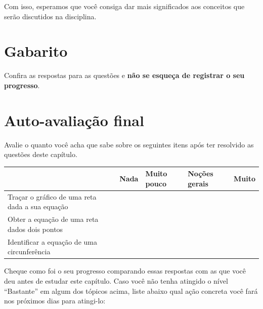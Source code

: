 \documentclass[main.tex]{subfiles}
\begin{document}
Com isso, esperamos que você consiga dar mais significados aos conceitos que serão discutidos na disciplina.

\section{Gabarito}

Confira as respostas para as questões e \textbf{não se esqueça de registrar o seu progresso}.

\imprimeGabarito

\paraAlunos

\section{Auto-avaliação final}
Avalie o quanto você acha que sabe sobre os seguintes itens após ter resolvido as questões deste capítulo.

\begin{center}
 \begin{tabular}{|p{25mm}||p{10mm}|p{10mm}|p{10mm}|p{10mm}|} 
 \hline
   & Nada & Muito pouco & Noções gerais & Muito\\
 \hline
 Traçar o gráfico de uma reta dada a sua equação &  &  &  &  \\ 
 \hline
 Obter a equação de uma reta dados dois pontos &  &  &  &  \\
 \hline
 Identificar a equação de uma circunferência &  &  &  &  \\
 \hline
\end{tabular}
\end{center}

Cheque como foi o seu progresso comparando essas respostas com as que você deu antes de estudar este capítulo. Caso você não tenha atingido o nível ``Bastante''  em algum dos tópicos acima, liste abaixo qual ação concreta você fará nos próximos dias para atingi-lo:

\paraAmbos
\end{document}
